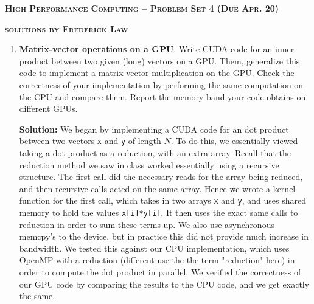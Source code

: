 \documentclass[10pt]{article}
\begin{document}
{ \large \textbf{\textsc{High Performance Computing -- Problem Set 4 (Due Apr. 20)}}}

{ \large \textbf{\textsc{solutions by Frederick Law}}}

\thispagestyle{empty}
\vspace{0.1in}


\begin{enumerate}

\item \textbf{Matrix-vector operations on a GPU}. Write CUDA code for an inner product between two given (long) vectors on a GPU. Them, generalize this code to implement a matrix-vector multiplication on the GPU. Check the correctness of your implementation by performing the same computation on the CPU and compare them. Report the memory band your code obtains on different GPUs.


\textbf{Solution:} We began by implementing a CUDA code for an dot product between two vectors \texttt{x} and \texttt{y} of length $N$. To do this, we essentially viewed taking a dot product as a reduction, with an extra array. Recall that the reduction method we saw in class worked essentially using a recursive structure. The first call did the necessary reads for the array being reduced, and then recursive calls acted on the same array. Hence we wrote a kernel function for the first call, which takes in two arrays \texttt{x} and \texttt{y}, and uses shared memory to hold the values \texttt{x[i]*y[i]}. It then uses the exact same calls to reduction in order to sum these terms up. We also use asynchronous memcpy's to the device, but in practice this did not provide much increase in bandwidth. We tested this against our CPU implementation, which uses OpenMP with a reduction (different use the the term "reduction" here) in order to compute the dot product in parallel. We verified the correctness of our GPU code by comparing the results to the CPU code, and we get exactly the same.


\end{enumerate}
\end{document}
